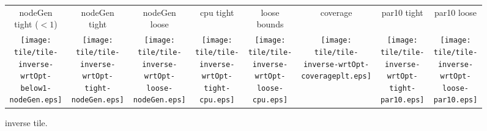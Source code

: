 \documentclass[a4paper,landscape]{article}
\begin{document}
\begin{figure}[t]
	\centering
		\begin{tabular}{c c c c c c c c}
            nodeGen tight ($<1$) & nodeGen tight & nodeGen loose & cpu
                                 tight& loose bounds & coverage & par10 tight & par10 loose\\
	   \begin{minipage}{\cpufigureplotwidth}
      \texttt{[image: tile/tile-inverse-wrtOpt-below1-nodeGen.eps]}
        \end{minipage}&
        \begin{minipage}{\cpufigureplotwidth}
        \texttt{[image: tile/tile-inverse-wrtOpt-tight-nodeGen.eps]}
        \end{minipage}&
        \begin{minipage}{\cpufigureplotwidth}
      \texttt{[image: tile/tile-inverse-wrtOpt-loose-nodeGen.eps]}
      \end{minipage}&
        \begin{minipage}{\cpufigureplotwidth}
        \texttt{[image: tile/tile-inverse-wrtOpt-tight-cpu.eps]}
        \end{minipage}&
        \begin{minipage}{\cpufigureplotwidth}
        \texttt{[image: tile/tile-inverse-wrtOpt-loose-cpu.eps]}
        \end{minipage}&
        \begin{minipage}{\cpufigureplotwidth}
        \texttt{[image: tile/tile-inverse-wrtOpt-coverageplt.eps]}
        \end{minipage}&
        \begin{minipage}{\cpufigureplotwidth}
        \texttt{[image: tile/tile-inverse-wrtOpt-tight-par10.eps]}
        \end{minipage}&
        \begin{minipage}{\cpufigureplotwidth}
        \texttt{[image: tile/tile-inverse-wrtOpt-loose-par10.eps]}
        \end{minipage}
	\end{tabular}
\caption{inverse tile.}
\label{fig:tile-inverse}
\end{figure}
\end{document}
